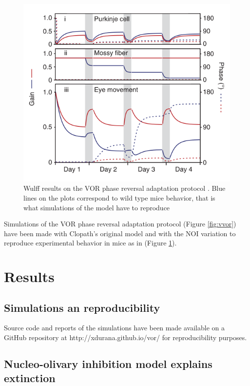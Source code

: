 \documentclass[12pt, a4paper,twoside]{tesi_upf}
\begin{document}
\begin{figure}
  \centering
  \includegraphics[scale=0.50]{images/gain.png}
  \caption[Wulff results on the VOR phase reversal adaptation protocol]{Wulff results on the VOR phase reversal adaptation protocol \cite{Wulff2009a}. Blue lines on the plots correspond to wild type mice behavior, that is what simulations of the model have to reproduce}
  \label{fig:wulffresults}
\end{figure}

Simulations of the VOR phase reversal adaptation protocol  (Figure \ref {fig:vvor}) have been made with Clopath's original model and with the NOI variation to reproduce experimental behavior in mice as in (Figure \ref {fig:wulffresults}).

\chapter{Results}

\section{Simulations an reproducibility}

Source code and reports of the simulations have been made available on a GitHub repository at http://xdurana.github.io/vor/ for reproducibility purposes.

\section{Nucleo-olivary inhibition model explains extinction}
\end{document}

